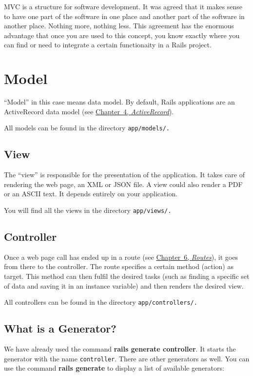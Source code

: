 \documentclass[a4paper]{book}
\newcommand{\chap}[1]{\newpage\thispagestyle{empty}\chapter{#1}\label{chap:\thechapter}}
\begin{document}
MVC is a structure for software development. It was agreed that it makes sense to have one part of the software in one place and another part of the software in another place. Nothing more, nothing less. This agreement has the enormous advantage that once you are used to this concept, you know exactly where you can find or need to integrate a certain functionaity in a Rails project.

\chap{Model}\label{model}

“Model” in this case means data model. By default, Rails applications are an ActiveRecord data model (see \hyperref[activerecordux5fchapter]{Chapter~4, \emph{ActiveRecord}}).

All models can be found in the directory \texttt{app/models/.}

\section{View}\label{view}

The “view” is responsible for the presentation of the application. It takes care of rendering the web page, an XML or JSON file. A view could also render a PDF or an ASCII text. It depends entirely on your application.

You will find all the views in the directory \texttt{app/views/.}

\section{Controller}\label{controller}

Once a web page call has ended up in a route (see \hyperref[routes]{Chapter~6, \emph{Routes}}), it goes from there to the controller. The route specifies a certain method (action) as target. This method can then fulfil the desired tasks (such as finding a specific set of data and saving it in an instance variable) and then renders the desired view.

All controllers can be found in the directory \texttt{app/controllers/.}

\section{What is a Generator?}\label{what-is-a-generator}

We have already used the command \textbf{rails generate controller}. It starts the generator with the name \texttt{controller}. There are other generators as well. You can use the command \textbf{rails generate} to display a list of available generators:
\end{document}
